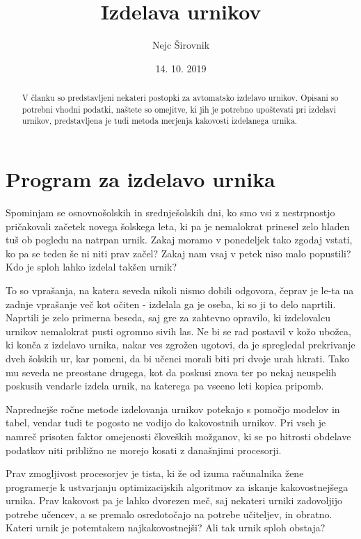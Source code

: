 \documentclass[a4paper, 10pt]{article}
\author{Nejc Širovnik}
\date{14. 10. 2019}
\title{Izdelava urnikov}
\begin{document}
\maketitle{}




\begin{abstract}


   
   
   V članku so predstavljeni nekateri postopki za avtomatsko izdelavo urnikov. Opisani so
   potrebni vhodni podatki, naštete so omejitve, ki jih je potrebno upoštevati pri izdelavi
   urnikov, predstavljena je tudi metoda merjenja kakovosti izdelanega urnika.
   
   
\end{abstract}

\section{Program za izdelavo urnika}


Spominjam se osnovnošolskih in srednješolskih dni, ko smo vsi z nestrpnostjo pričakovali
začetek novega šolskega leta, ki pa je nemalokrat prinesel zelo hladen tuš ob pogledu na
natrpan urnik. Zakaj moramo v ponedeljek tako zgodaj vstati, ko pa se teden še ni niti
prav začel? Zakaj nam vsaj v petek niso malo popustili? Kdo je sploh lahko izdelal
takšen urnik?


To so vprašanja, na katera seveda nikoli nismo dobili odgovora, čeprav je le-ta na zadnje
vprašanje več kot očiten - izdelala ga je oseba, ki so ji to delo naprtili. Naprtili je
zelo primerna beseda, saj gre za zahtevno opravilo, ki izdelovalcu urnikov nemalokrat
pusti ogromno sivih las. Ne bi se rad postavil v kožo ubožca, ki konča z izdelavo urnika,
nakar ves zgrožen ugotovi, da je spregledal prekrivanje dveh šolskih ur, kar pomeni, da
bi učenci morali biti pri dvoje urah hkrati. Tako mu seveda ne preostane drugega, kot da
poskusi znova ter po nekaj neuspelih poskusih vendarle izdela urnik, na katerega pa vseeno
leti kopica pripomb.

Naprednejše ročne metode izdelovanja urnikov potekajo s pomočjo modelov in tabel, vendar
tudi te pogosto ne vodijo do kakovostnih urnikov. Pri vseh je namreč prisoten faktor
omejenosti človeških možganov, ki se po hitrosti obdelave podatkov niti približno ne
morejo kosati z današnjimi procesorji.

Prav zmogljivost procesorjev je tista, ki že od izuma računalnika žene programerje k
ustvarjanju optimizacijskih algoritmov za iskanje kakovostnejšega urnika. Prav kakovost
pa je lahko dvorezen meč, saj nekateri urniki zadovoljijo potrebe učencev, a se premalo
osredotočajo na potrebe učiteljev, in obratno. Kateri urnik je potemtakem najkakovostnejši?
Ali tak urnik sploh obstaja?
\end{document}
